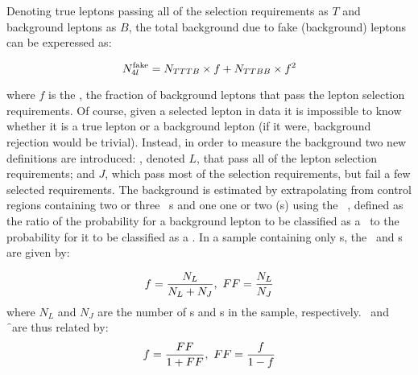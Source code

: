 Denoting true leptons passing all of the selection requirements as $T$ and background leptons as $B$, the total background due
to fake (background) leptons can be experessed as:

\begin{equation}
N_{4l}^{\rm fake} = N_{TTTB} \times f + N_{TTBB} \times f^{2}
\label{eqn:bg-4l-true}
\end{equation}

where $f$ is the \frate, the fraction of background leptons that pass the lepton selection
requirements. Of course, given a selected lepton in data it is impossible to
know whether it is a true lepton or a background lepton (if it were, background
rejection would be trivial). Instead, in order to measure the background 
two new definitions are introduced: , denoted $L$, that
pass all of the lepton selection requirements; and  $J$, which
pass most of the selection requirements, but fail a few selected requirements.
The background is estimated by extrapolating from control regions containing
two or three \sellep\ s and one one or two \lljet (s) using the
\intro{\ffactor}\ \FF, defined as the ratio of the probability for a background lepton to be
classified as a \sellep\ to the probability for it to be classified as a \lljet.
In a sample containing only \bglep s, the \ffactor\ and \frate s are given by: 

\begin{equation}
f = \frac{N_{L}}{N_{L} + N_{J}},\ FF = \frac{N_{L}}{N_{J}}
\end{equation}
where $N_{L}$ and $N_{J}$ are the number of \sellep s and \lljet s in the sample,
respectively. \FF\ and \f\ are thus related by:
\begin{equation}
f = \frac{FF}{1 + FF},\ FF = \frac{f}{1-f}
\label{eqn:bg-f-FF-relations}
\end{equation}


